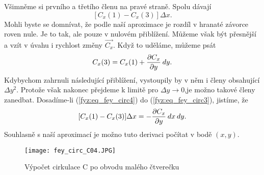     Všimněme si prvního a třetího členu na pravé straně. Spolu dávají
    \begin{equation}\label{fyz:eq_fey_circ3}
      [C_x(1) - C_x(3)]\Delta x.  
    \end{equation}
    Mohli byste se domnívat, že podle naší aproximace je rozdíl v hranaté závorce roven nule. Je to 
    tak, ale pouze v nulovém přiblížení. Můžeme však být přesnější a vzít v úvahu i rychlost změny 
    \(\vec{C_x}\). Když to uděláme, můžeme psát
    \begin{equation}\label{fyz:eq_fey_circ4}
      C_x(3) = C_x(1)+\frac{\partial C_x}{\partial y}\hspace{2pt}dy.  
    \end{equation}
    Kdybychom zahrnuli následující přiblížení, vystoupily by v něm i členy obsahující \(\Delta
    y^2\). Protože však nakonec přejdeme k limitě pro \(\Delta y\rightarrow0\),je možno takové členy
    zanedbat. Dosadíme-li (\ref{fyz:eq_fey_circ4}) do (\ref{fyz:eq_fey_circ3}), jistíme, že
    \begin{equation}\label{fyz:eq_fey_circ5}
      [C_x(1) - C_x(3)]\Delta x = -\frac{\partial C_x}{\partial y}\hspace{2pt}dx\hspace{2pt}dy.  
    \end{equation}  
    Souhlasně s naší aproximací je možno tuto derivaci počítat v bodě \((x, y)\).             

    \begin{figure}
      \centering
      \texttt{[image: fey\_circ\_C04.JPG]}
      \caption{Výpočet cirkulace C po obvodu malého čtverečku}
      \label{fyz:fig_fey_circ_C04}
    \end{figure}                           

